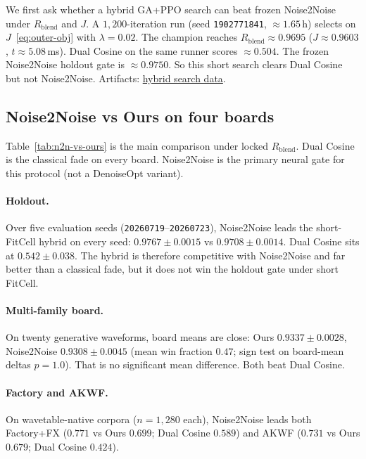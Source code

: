 We first ask whether a hybrid GA+PPO search can beat frozen Noise2Noise under $R_{\mathrm{blend}}$ and $J$.
A $1{,}200$-iteration run (seed \texttt{1902771841}, ${\approx}1.65$\,h) selects on $J$~\eqref{eq:outer-obj} with $\lambda{=}0.02$.
The champion reaches $R_{\mathrm{blend}}{\approx}0.9695$ ($J{\approx}0.9603$, $t{\approx}5.08$\,ms).
Dual Cosine on the same runner scores ${\approx}0.504$.
The frozen Noise2Noise holdout gate is ${\approx}0.9750$.
So this short search clears Dual Cosine but not Noise2Noise.
Artifacts:
\href{https://github.com/reeldemo/denoise-opt-meta/blob/master/paper/Unsupervised_Wrap-Discontinuity_Repair_in_Wavetable_Synthesis_via_Hybrid_GA-PPO_Meta-Search_v12/figures/meta_approach_compare_v10.json}{hybrid search data}.

\subsection{Noise2Noise vs Ours on four boards}
\label{sec:n2n-vs-ours-boards}

Table~\ref{tab:n2n-vs-ours} is the main comparison under locked $R_{\mathrm{blend}}$.
Dual Cosine is the classical fade on every board.
Noise2Noise is the primary neural gate for this protocol (not a DenoiseOpt variant).

\paragraph{Holdout.}
Over five evaluation seeds (\texttt{20260719}--\texttt{20260723}), Noise2Noise leads the short-FitCell hybrid on every seed:
$0.9767{\pm}0.0015$ vs $0.9708{\pm}0.0014$.
Dual Cosine sits at $0.542{\pm}0.038$.
The hybrid is therefore competitive with Noise2Noise and far better than a classical fade, but it does not win the holdout gate under short FitCell.

\paragraph{Multi-family board.}
On twenty generative waveforms, board means are close:
Ours $0.9337{\pm}0.0028$, Noise2Noise $0.9308{\pm}0.0045$
(mean win fraction $0.47$; sign test on board-mean deltas $p{=}1.0$).
That is no significant mean difference. Both beat Dual Cosine.

\paragraph{Factory and AKWF.}
On wavetable-native corpora ($n{=}1{,}280$ each), Noise2Noise leads both Factory+FX
($0.771$ vs Ours $0.699$; Dual Cosine $0.589$)
and AKWF
($0.731$ vs Ours $0.679$; Dual Cosine $0.424$).

